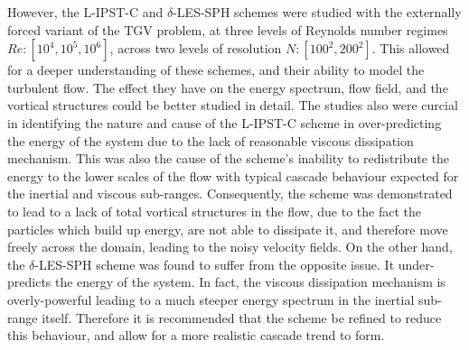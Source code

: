 However, the L-IPST-C and $\delta$-LES-SPH schemes were studied with the externally forced variant of the TGV problem, at three levels of Reynolds number regimes $Re: [10^4, 10^5, 10^6]$, across two levels of resolution $N: [100^2, 200^2]$.
This allowed for a deeper understanding of these schemes, and their ability to model the turbulent flow. The effect they have on the energy spectrum, flow field, and the vortical structures could be better studied in detail.
The studies also were curcial in identifying the nature and cause of the L-IPST-C scheme in over-predicting the energy of the system due to the lack of reasonable viscous dissipation mechanism. This was also the cause of the scheme's inability to redistribute the energy to the lower scales of the flow with typical cascade behaviour expected for the inertial and viscous sub-ranges. Consequently, the scheme was demonstrated to lead to a lack of total vortical structures in the flow, due to the fact the particles which build up energy, are not able to dissipate it, and therefore move freely across the domain, leading to the noisy velocity fields.
On the other hand, the $\delta$-LES-SPH scheme was found to suffer from the opposite issue. It under-predicts the energy of the system. In fact, the viscous dissipation mechanism is overly-powerful leading to a much steeper energy spectrum in the inertial sub-range itself. Therefore it is recommended that the scheme be refined to reduce this behaviour, and allow for a more realistic cascade trend to form.

